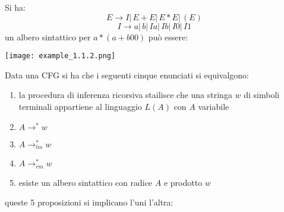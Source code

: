 \begin{example}
	Si ha:
	$$E\to I|\, E+E|\, E*E|\, (E)$$
	$$I\to a|\,b|\,Ia|\,Ib|\,I0|\,I1$$
	un albero sintattico per $a*(a+b00)$ può essere:
	\begin{center}
\texttt{[image: example\_1.1.2.png]}
	\end{center}
\end{example}
\newpage
Data una CFG si ha che i seguenti cinque enunciati si equivalgono:
\begin{enumerate}
	\item la procedura di inferenza ricorsiva stailisce che una stringa $w$ di simboli terminali appartiene al linguaggio $L(A)$ con $A$ variabile
	\item $A\to ^*w$
	\item $A\to^*_{lm}w$
	\item $A\to^*_{rm}w$
	\item esiste un albero sintattico con radice $A$ e prodotto $w$
\end{enumerate}
queste 5 proposizioni si implicano l'uni l'altra:
\begin{center}
\end{center}

